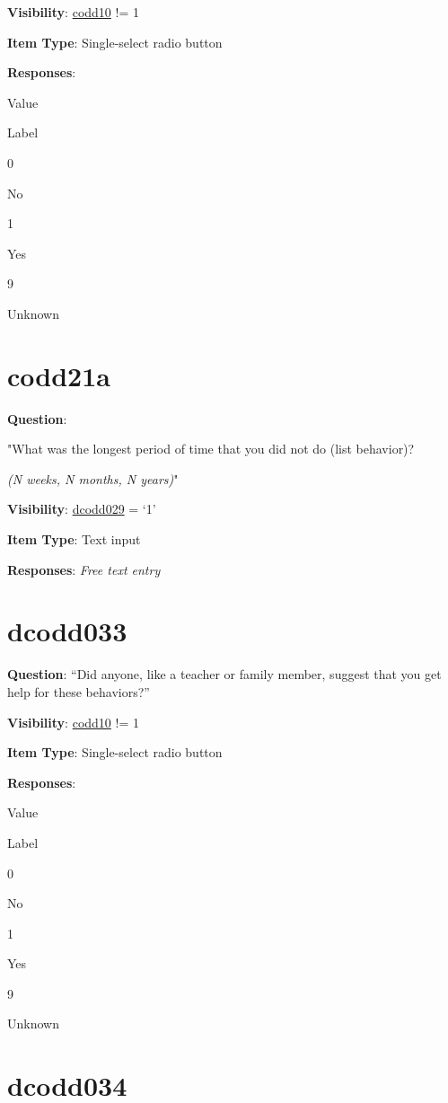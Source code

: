 \documentclass[]{book}
\begin{document}
\textbf{Visibility}: \protect\hyperlink{codd10}{codd10} != 1

\textbf{Item Type}: Single-select radio button

\textbf{Responses}:

Value

Label

0

No

1

Yes

9

Unknown

\hypertarget{codd21a}{%
\section{codd21a}\label{codd21a}}

\textbf{Question}:

"What was the longest period of time that you did not do (list behavior)?

\emph{(N weeks, N months, N years)}"

\textbf{Visibility}: \protect\hyperlink{dcodd029}{dcodd029} = `1'

\textbf{Item Type}: Text input

\textbf{Responses}: \emph{Free text entry}

\hypertarget{dcodd033}{%
\section{dcodd033}\label{dcodd033}}

\textbf{Question}: ``Did anyone, like a teacher or family member, suggest that you get help for these behaviors?''

\textbf{Visibility}: \protect\hyperlink{codd10}{codd10} != 1

\textbf{Item Type}: Single-select radio button

\textbf{Responses}:

Value

Label

0

No

1

Yes

9

Unknown

\hypertarget{dcodd034}{%
\section{dcodd034}\label{dcodd034}}
\end{document}
